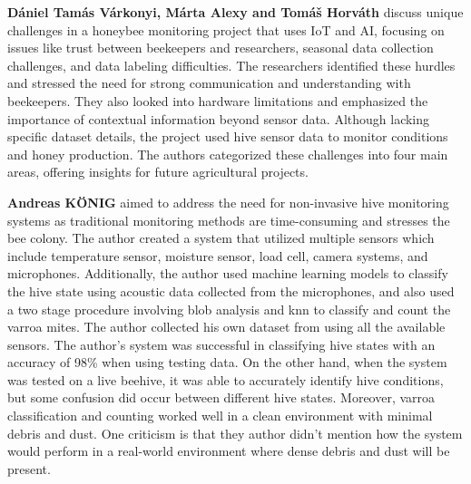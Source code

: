 \documentclass[12pt]{article}
\begin{document}
	
	\noindent \textbf{Dániel Tamás Várkonyi, Márta Alexy and Tomáš Horváth}\cite{varkonyi2022beyond} discuss unique challenges in a honeybee monitoring project that uses IoT and AI, focusing on issues like trust between beekeepers and researchers, seasonal data collection challenges, and data labeling difficulties. The researchers identified these hurdles and stressed the need for strong communication and understanding with beekeepers. They also looked into hardware limitations and emphasized the importance of contextual information beyond sensor data. Although lacking specific dataset details, the project used hive sensor data to monitor conditions and honey production. The authors categorized these challenges into four main areas, offering insights for future agricultural projects. \\ \newline
	
	
	
	\noindent \textbf{Andreas KÖNIG} \cite{konig2019indusbee} aimed to address the need for non-invasive hive monitoring systems as traditional monitoring methods are time-consuming and stresses the bee colony. The author created a system that utilized multiple sensors which include temperature sensor, moisture sensor, load cell, camera systems, and microphones. Additionally, the author used machine learning models to classify the hive state using acoustic data collected from the microphones, and also used a two stage procedure involving blob analysis and knn to classify and count the varroa mites. The author collected his own dataset from using all the available sensors. The author's system was successful in classifying hive states with an accuracy of 98\% when using testing data. On the other hand, when the system was tested on a live beehive, it was able to accurately identify hive conditions, but some confusion did occur between different hive states. Moreover, varroa classification and counting worked well in a clean environment with minimal debris and dust. One criticism is that they author didn't mention how the system would perform in a real-world environment where dense debris and dust will be present. \\ \newline 
	
	
	
\end{document}
